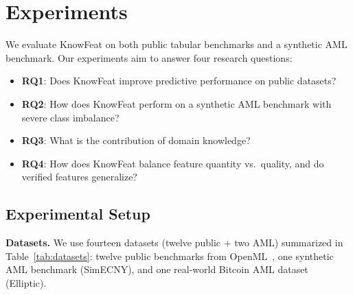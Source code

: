 \section{Experiments}
\label{sec:experiments}

We evaluate KnowFeat on both public tabular benchmarks and a synthetic AML benchmark. Our experiments aim to answer four research questions:
\begin{itemize}
    \item \textbf{RQ1}: Does KnowFeat improve predictive performance on public datasets?
    \item \textbf{RQ2}: How does KnowFeat perform on a synthetic AML benchmark with severe class imbalance?
    \item \textbf{RQ3}: What is the contribution of domain knowledge?
    \item \textbf{RQ4}: How does KnowFeat balance feature quantity vs.\ quality, and do verified features generalize?
\end{itemize}

\subsection{Experimental Setup}
\label{subsec:setup}

\textbf{Datasets.}
We use fourteen datasets (twelve public + two AML) summarized in Table~\ref{tab:datasets}: twelve public benchmarks from OpenML~\cite{vanschoren2014openml}, one synthetic AML benchmark (SimECNY), and one real-world Bitcoin AML dataset (Elliptic).

